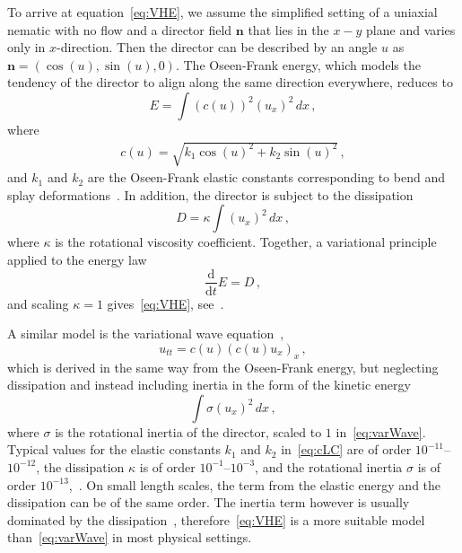 \documentclass[11pt,leqno]{amsart}
\newcommand{\ddt}[1]{\frac{\mathrm{d}#1}{\mathrm{d}t}}
\newcommand{\ptt}[1]{#1_{tt}}
\newcommand{\px}[1]{#1_x }
\begin{document}
To arrive at equation~\eqref{eq:VHE}, we assume the simplified setting of a uniaxial nematic with no flow and a director field $\mathbf{n}$ that lies in the $x-y$ plane and varies only in $x$-direction. Then the director can be described by an angle $u$ as $\mathbf{n}=(\cos(u),\sin(u),0)$. The Oseen-Frank energy, which models the tendency of the director to align along the same direction everywhere, reduces to 
\begin{equation*}
  E=\int (c(u))^2 (\px u)^2\,dx\,,
\end{equation*} 
where 
\begin{align}\label{eq:cLC}
  c(u)=\sqrt{k_1 \cos(u)^2 + k_2\sin(u)^2}\,,
\end{align}
and $k_1$ and $k_2$ are the Oseen-Frank elastic constants corresponding to bend and splay deformations~\cite{Stewart2004-Book,DeGennes1993-Book,Virga1994-Book,Oseen1933,Frank1958}. In addition, the director is subject to the dissipation
\begin{equation*}
  D=\kappa \int (u_x)^2\,dx\,,
\end{equation*}
where $\kappa$ is the rotational viscosity coefficient. Together, a variational principle applied to the energy law
\begin{equation*}
  \ddt{} E=D\,,
\end{equation*}
and scaling $\kappa=1$ gives~\eqref{eq:VHE}, see~\cite{AursandRidder2015,AursandNapoliRidder2015}.

A similar model is the variational wave equation~\cite{HunterSaxton1991,Saxton1989},
\begin{equation}\label{eq:varWave}
  \ptt{u}=c(u)\px{(c(u)\px{u})}\,,
\end{equation}
which is derived in the same way from the Oseen-Frank energy, but neglecting dissipation and instead including inertia in the form of the kinetic energy
\begin{equation*}
  \int \sigma (\px{u})^2 \,dx\,,
\end{equation*}
where $\sigma$ is the rotational inertia of the director, scaled to $1$ in~\eqref{eq:varWave}. Typical values for the elastic constants $k_1$ and $k_2$ in~\eqref{eq:cLC} are of order $10^{-11}$--$10^{-12}$, the dissipation $\kappa$ is of order $10^{-1}$--$10^{-3}$, and the rotational inertia $\sigma$ is of order $10^{-13}$,~\cite{Stewart2004-Book,XuChangQingLei1987}. On small length scales, the term from the elastic energy and the dissipation can be of the same order. The inertia term however is usually dominated by the dissipation~\cite{AursandRidder2015}, therefore~\eqref{eq:VHE} is a more suitable model than~\eqref{eq:varWave} in most physical settings.
\end{document}
